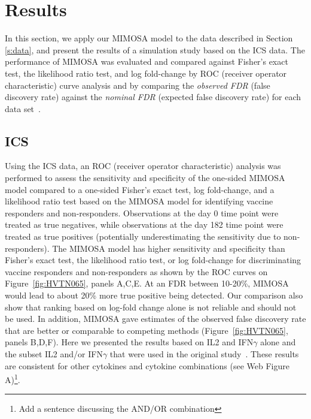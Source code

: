 \documentclass[useAMS,referee,usenatbib]{biom}
\begin{document}
\section{Results}
\label{s:results}
In this section, we apply our MIMOSA model to the data described in Section \ref{s:data}, and present the results of a simulation study based on the ICS data. The performance of MIMOSA was evaluated and compared against Fisher's exact test, the likelihood ratio test, and log fold-change by ROC (receiver operator characteristic) curve analysis and by comparing the \textit{observed FDR} (false discovery rate) against the \textit{nominal FDR} (expected false discovery rate) for each data set~\citep{Storey:2002vj}.


\subsection{ICS}
Using the ICS data, an ROC (receiver operator characteristic) analysis was performed to assess the sensitivity and specificity of the one-sided MIMOSA model compared to a one-sided Fisher's exact test, log fold-change, and a likelihood ratio test based on the MIMOSA model for identifying vaccine responders and non-responders. Observations at the day 0 time point were treated as true negatives, while observations at the day 182 time point were treated as true positives (potentially underestimating the sensitivity due to non-responders). The MIMOSA model has higher sensitivity and specificity than Fisher's exact test, the likelihood ratio test, or log fold-change for discriminating vaccine responders and non-responders  as shown by the ROC curves on Figure~\ref{fig:HVTN065}, panels A,C,E. 
At an FDR between 10-20\%, MIMOSA would lead to about 20\% more true positive being detected. Our comparison also show that ranking based on log-fold change alone is not reliable and should not be used.
In addition, MIMOSA gave estimates of the observed false discovery rate that are better or comparable to competing methods (Figure~\ref{fig:HVTN065}, panels B,D,F). Here we presented the results based on IL2 and IFN$\gamma$ alone and the subset IL2 and/or IFN$\gamma$ that were used in the original study~\citep{Goepfert:2011ci}. These results are consistent for other cytokines and cytokine combinations (see Web Figure A)\footnote{Add a sentence discussing the AND/OR combination}.
\end{document}
